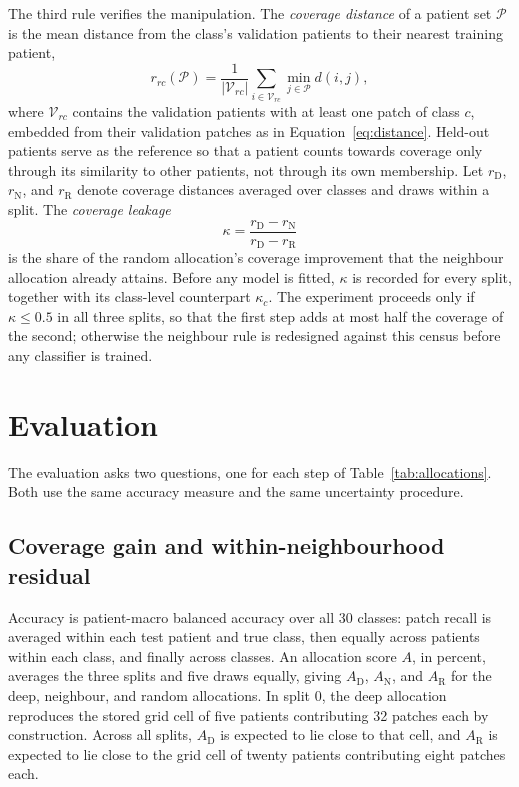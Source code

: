 \documentclass[11pt]{article}
\begin{document}
The third rule verifies the manipulation. The \emph{coverage distance} of a patient set $\mathcal P$ is the mean distance from the class's validation patients to their nearest training patient,
\begin{equation}
 r_{rc}(\mathcal P)=\frac{1}{|\mathcal V_{rc}|}\sum_{i\in\mathcal V_{rc}}\min_{j\in\mathcal P}d(i,j),
 \label{eq:coverage}
\end{equation}
\noindent where $\mathcal V_{rc}$ contains the validation patients with at least one patch of class $c$, embedded from their validation patches as in Equation~\eqref{eq:distance}. Held-out patients serve as the reference so that a patient counts towards coverage only through its similarity to other patients, not through its own membership. Let $r_{\mathrm D}$, $r_{\mathrm N}$, and $r_{\mathrm R}$ denote coverage distances averaged over classes and draws within a split. The \emph{coverage leakage}
\begin{equation}
 \kappa=\frac{r_{\mathrm D}-r_{\mathrm N}}{r_{\mathrm D}-r_{\mathrm R}}
 \label{eq:leakage}
\end{equation}
\noindent is the share of the random allocation's coverage improvement that the neighbour allocation already attains. Before any model is fitted, $\kappa$ is recorded for every split, together with its class-level counterpart $\kappa_c$. The experiment proceeds only if $\kappa\le 0.5$ in all three splits, so that the first step adds at most half the coverage of the second; otherwise the neighbour rule is redesigned against this census before any classifier is trained.

\section{Evaluation}
\label{sec:evaluation}
The evaluation asks two questions, one for each step of Table~\ref{tab:allocations}. Both use the same accuracy measure and the same uncertainty procedure.

\subsection{Coverage gain and within-neighbourhood residual}
\label{sec:contrasts}
Accuracy is patient-macro balanced accuracy over all 30 classes: patch recall is averaged within each test patient and true class, then equally across patients within each class, and finally across classes. An allocation score $A$, in percent, averages the three splits and five draws equally, giving $A_{\mathrm D}$, $A_{\mathrm N}$, and $A_{\mathrm R}$ for the deep, neighbour, and random allocations. In split 0, the deep allocation reproduces the stored grid cell of five patients contributing 32 patches each by construction. Across all splits, $A_{\mathrm D}$ is expected to lie close to that cell, and $A_{\mathrm R}$ is expected to lie close to the grid cell of twenty patients contributing eight patches each.
\end{document}
